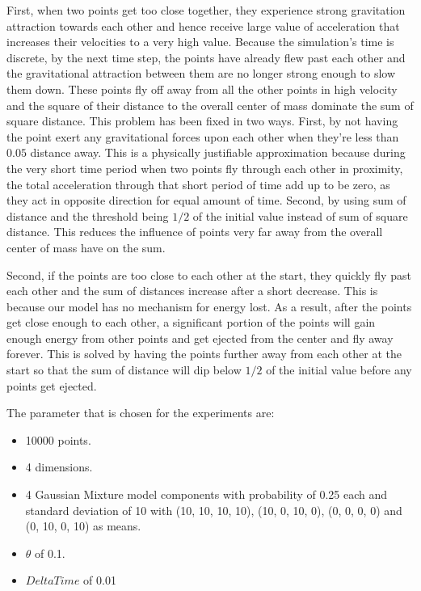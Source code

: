 \documentclass{article}
\begin{document}
First, when two points get too close together, they experience strong gravitation attraction towards
each other and hence receive large value of acceleration that increases their velocities to a very
high value. Because the simulation's time is discrete, by the next time step, the points have
already flew past each other and the gravitational attraction between them are no longer strong
enough to slow them down. These points fly off away from all the other points in high velocity and
the square of their distance to the overall center of mass dominate the sum of square distance. This
problem has been fixed in two ways. First, by not having the point exert any gravitational forces
upon each other when they're less than \(0.05\) distance away. This is a physically justifiable
approximation because during the very short time period when two points fly through each other in
proximity, the total acceleration through that short period of time add up to be zero, as they act
in opposite direction for equal amount of time. Second, by using sum of distance and the threshold
being \(1/2\) of the initial value instead of sum of square distance. This reduces the influence of
points very far away from the overall center of mass have on the sum.

Second, if the points are too close to each other at the start, they quickly fly past each other and
the sum of distances increase after a short decrease. This is because our model has no mechanism for
energy lost. As a result, after the points get close enough to each other, a significant portion of
the points will gain enough energy from other points and get ejected from the center and fly away
forever. This is solved by having the points further away from each other at the start so that the
sum of distance will dip below \(1/2\) of the initial value before any points get ejected.

The parameter that is chosen for the experiments are:
\begin{itemize}
	\item 10000 points.
	\item 4 dimensions.
	\item 4 Gaussian Mixture model components with probability of 0.25 each and standard deviation
		of 10 with (10, 10, 10, 10), (10, 0, 10, 0), (0, 0, 0, 0) and (0, 10, 0, 10) as means.
	\item \(\theta\) of 0.1.
	\item \(DeltaTime\) of 0.01
\end{itemize}
\end{document}
